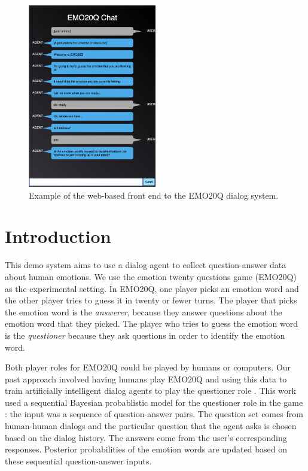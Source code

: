 \documentclass[conference]{IEEEtran}
\begin{document}
\begin{figure}[h]
\centering
\includegraphics[width=0.5\textwidth]{emo20q-flask-websocket}
\caption{Example of the web-based front end to the EMO20Q dialog
  system.}
\label{fig:emo20q-flask-websocket}
\end{figure}


\section{Introduction}

This demo system aims to use a dialog agent to collect question-answer
data about human emotions.  We use the emotion twenty questions game
(EMO20Q) as the experimental setting.  In EMO20Q, one player picks an
emotion word and the other player tries to guess it in twenty or fewer
turns. The player that picks the emotion word is the {\it answerer},
because they answer questions about the emotion word that they picked.
The player who tries to guess the emotion word is the {\it questioner}
because they ask questions in order to identify the emotion word.

Both player roles for EMO20Q could be played by humans or computers.
Our past approach involved having humans play EMO20Q and using this
data to train artificially intelligent dialog agents to play the
questioner role \cite{Kazemzadeh2012}.  This work used a sequential
Bayesian probablistic model for the questioner role in the game
\cite{Kazemzadeh2012}: the input was a sequence of question-answer
pairs. The question set comes from human-human dialogs and the
particular question that the agent asks is chosen based on the dialog
history. The answers come from the user's corresponding responses.
Posterior probabilities of the emotion words are updated based on
these sequential question-answer inputs.
\end{document}
